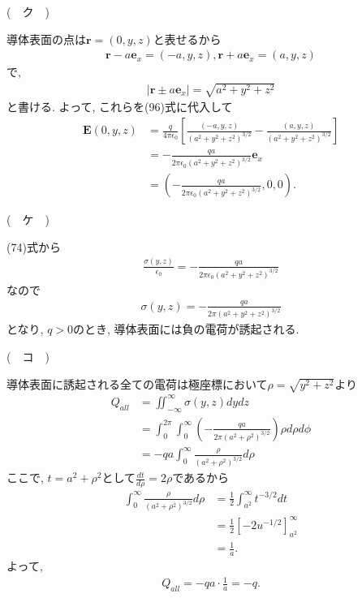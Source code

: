 \documentclass[a4paper,12pt]{jlreq}
\begin{document}
\vspace{20mm}
(　ク　)\par
導体表面の点は$\bm{r} = (0,y,z)$と表せるから
\begin{align}
  \bm{r} - a\bm{e}_x = (-a,y,z),　\bm{r} + a\bm{e}_x = (a,y,z)
\end{align}
で, 
\begin{align}
  |\bm{r} \pm a\bm{e}_x| = \sqrt{a^2 + y^2 + z^2}
\end{align}
と書ける. よって, これらを(96)式に代入して
\begin{align}
  \bm{E}(0,y,z) &= \frac{q}{4\pi \epsilon_0} \left[\frac{(-a,y,z)}{(a^2 + y^2 + z^2)^{3/2}} - \frac{(a,y,z)}{(a^2 + y^2 + z^2)^{3/2}}\right]\\
  &= -\frac{qa}{2\pi \epsilon_0 (a^2 + y^2 + z^2)^{3/2}}\bm{e}_x\\
  &= \left(-\frac{qa}{2\pi \epsilon_0 (a^2 + y^2 + z^2)^{3/2}},0,0\right).
\end{align}

\vspace{10mm}
(　ケ　)\par
(74)式から
\begin{align}
  \frac{\sigma(y,z)}{\epsilon_0} = -\frac{qa}{2\pi \epsilon_0 (a^2 + y^2 + z^2)^{3/2}}
\end{align}
なので
\begin{align}
  \sigma(y,z) = -\frac{qa}{2\pi (a^2 + y^2 + z^2)^{3/2}}
\end{align}
となり, $q>0$のとき, 導体表面には負の電荷が誘起される.

\vspace{10mm}
(　コ　)\par
導体表面に誘起される全ての電荷は極座標において$\rho = \sqrt{y^2 + z^2}$より
\begin{align}
  Q_{all} &= \iint_{-\infty}^{\infty} \sigma(y,z) dydz\\
  &= \int_{0}^{2\pi} \int_{0}^{\infty} \left(-\frac{qa}{2\pi (a^2+\rho^2)^{3/2}}\right) \rho d\rho d\phi\\
  &= -qa \int_{0}^{\infty} \frac{\rho}{(a^2+\rho^2)^{3/2}}d\rho
\end{align}
ここで, $t = a^2 + \rho^2$として$\frac{dt}{d\rho} = 2\rho$であるから
\begin{align}
  \int_{0}^{\infty} \frac{\rho}{(a^2+\rho^2)^{3/2}}d\rho &= \frac{1}{2} \int_{a^2}^{\infty} t^{-3/2} dt\\
  &= \frac{1}{2} \left[-2u^{-1/2}\right]_{a^2}^{\infty}\\
  &= \frac{1}{a}.
\end{align}
よって,
\begin{align}
  Q_{all} = -qa \cdot \frac{1}{a} = -q.
\end{align}
\end{document}
